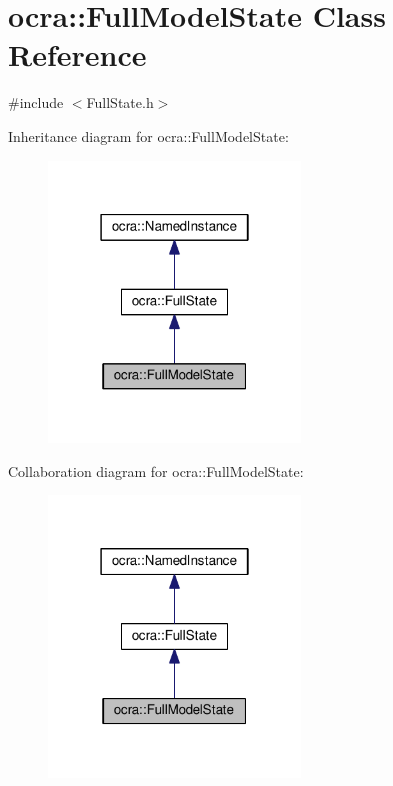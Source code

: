 \hypertarget{classocra_1_1FullModelState}{}\section{ocra\+:\+:Full\+Model\+State Class Reference}
\label{classocra_1_1FullModelState}


{\ttfamily \#include $<$Full\+State.\+h$>$}



Inheritance diagram for ocra\+:\+:Full\+Model\+State\+:
\nopagebreak
\begin{figure}[H]
\begin{center}
\leavevmode
\includegraphics[width=190pt]{d1/dd5/classocra_1_1FullModelState__inherit__graph}
\end{center}
\end{figure}


Collaboration diagram for ocra\+:\+:Full\+Model\+State\+:
\nopagebreak
\begin{figure}[H]
\begin{center}
\leavevmode
\includegraphics[width=190pt]{d6/d98/classocra_1_1FullModelState__coll__graph}
\end{center}
\end{figure}

